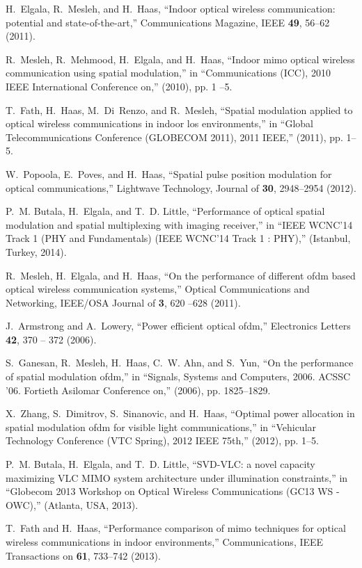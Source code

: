 \documentclass[12pt,letterpaper,onecolumn]{article} %
\begin{document}
%
%
\begin{thebibliography}{10}
\newcommand{\enquote}[1]{``#1''}

H.~Elgala, R.~Mesleh, and H.~Haas, \enquote{Indoor optical wireless
  communication: potential and state-of-the-art,} Communications Magazine, IEEE
  \textbf{49}, 56--62 (2011).

R.~Mesleh, R.~Mehmood, H.~Elgala, and H.~Haas, \enquote{Indoor mimo optical
  wireless communication using spatial modulation,} in \enquote{Communications
  (ICC), 2010 IEEE International Conference on,}  (2010), pp. 1 --5.

T.~Fath, H.~Haas, M.~Di~Renzo, and R.~Mesleh, \enquote{Spatial modulation
  applied to optical wireless communications in indoor los environments,} in
  \enquote{Global Telecommunications Conference (GLOBECOM 2011), 2011 IEEE,}
  (2011), pp. 1--5.

W.~Popoola, E.~Poves, and H.~Haas, \enquote{Spatial pulse position modulation
  for optical communications,} Lightwave Technology, Journal of \textbf{30},
  2948--2954 (2012).

P.~M. Butala, H.~Elgala, and T.~D. Little, \enquote{Performance of optical
  spatial modulation and spatial multiplexing with imaging receiver,} in
  \enquote{IEEE WCNC'14 Track 1 (PHY and Fundamentals) (IEEE WCNC'14 Track 1 :
  PHY),}  (Istanbul, Turkey, 2014).

R.~Mesleh, H.~Elgala, and H.~Haas, \enquote{On the performance of different
  ofdm based optical wireless communication systems,} Optical Communications
  and Networking, IEEE/OSA Journal of \textbf{3}, 620 --628 (2011).

J.~Armstrong and A.~Lowery, \enquote{Power efficient optical ofdm,} Electronics
  Letters \textbf{42}, 370 -- 372 (2006).

S.~Ganesan, R.~Mesleh, H.~Haas, C.~W. Ahn, and S.~Yun, \enquote{On the
  performance of spatial modulation ofdm,} in \enquote{Signals, Systems and
  Computers, 2006. ACSSC '06. Fortieth Asilomar Conference on,}  (2006), pp.
  1825--1829.

X.~Zhang, S.~Dimitrov, S.~Sinanovic, and H.~Haas, \enquote{Optimal power
  allocation in spatial modulation ofdm for visible light communications,} in
  \enquote{Vehicular Technology Conference (VTC Spring), 2012 IEEE 75th,}
  (2012), pp. 1--5.

P.~M. Butala, H.~Elgala, and T.~D. Little, \enquote{{SVD-VLC:} a novel capacity
  maximizing {VLC} {MIMO} system architecture under illumination constraints,}
  in \enquote{Globecom 2013 Workshop on Optical Wireless Communications (GC13
  WS - OWC),}  (Atlanta, USA, 2013).

T.~Fath and H.~Haas, \enquote{Performance comparison of mimo techniques for
  optical wireless communications in indoor environments,} Communications, IEEE
  Transactions on \textbf{61}, 733--742 (2013).

\end{thebibliography}
\pagebreak
\end{document}
